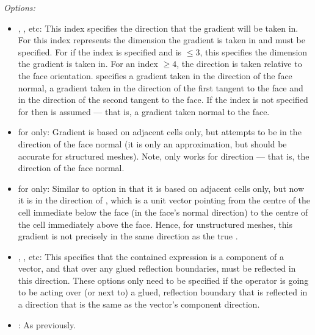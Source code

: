 

\emph{Options:}
%
\begin{itemize}
\item {}, , etc:  This index specifies the direction that the gradient will be taken in.  For  this index represents the dimension the gradient is taken in and must be specified.  For  if the index is specified and is $\le 3$, this specifies the dimension the gradient is taken in.  For an index $\ge 4$, the direction is taken relative to the face orientation.   specifies a gradient taken in the direction of the face normal,  a gradient taken in the direction of the first tangent to the face and  in the direction of the second tangent to the face.  If the index is not specified for  then  is assumed --- that is, a gradient taken normal to the face.

\item {} for  only:  Gradient is based on adjacent cells only, but attempts to be in the direction of the face normal (it is only an approximation, but should be accurate for structured meshes).  Note, only works for  direction --- that is, the direction of the face normal.
\item {} for  only:  Similar to option  in that it is based on adjacent cells only, but now it is in the direction of , which is a unit vector pointing from the centre of the cell immediate below the face (in the face's normal direction) to the centre of the cell immediately above the face.  Hence, for unstructured meshes, this gradient is not precisely in the same direction as the true .
\item {}, , etc:  This specifies that the contained expression is a component of a vector, and that over any glued reflection boundaries, must be reflected in this direction.  These options only need to be specified if the operator is going to be acting over (or next to) a glued, reflection boundary that is reflected in a direction that is the same as the vector's component direction.
\item {}:  As previously.

\end{itemize}

